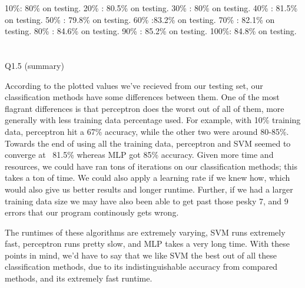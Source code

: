 \documentclass{article}
\begin{document}
10\%: 80\%  on testing.
20\% : 80.5\% on testing.
30\% : 80\% on testing.
40\% : 81.5\% on testing.
50\% : 79.8\% on testing.
60\% :83.2\% on testing.
70\% : 82.1\% on testing.
80\% : 84.6\% on testing.
90\% : 85.2\% on testing.
100\%: 84.8\% on testing.
\\
\\
\\
{\LARGE Q1.5 (summary)}

According to the plotted values we've recieved from our testing set, our classification methods have some differences between them. One of the most flagrant differences is that perceptron does the worst out of all of them, more generally with less training data percentage used. For example, with 10\% training data, perceptron hit a 67\% accuracy, while the other two were around 80-85\%. Towards the end of using all the training data, perceptron and SVM seemed to converge at ~81.5\% whereas MLP got 85\% accuracy. Given more time and resources, we could have ran tons of iterations on our classification methods; this takes a ton of time. We could also apply a learning rate if we knew how, which would also give us better results and longer runtime. Further, if we had a larger training data size we may have also been able to get past those pesky 7, and 9 errors that our program continously gets wrong.

The runtimes of these algorithms are extremely varying, SVM runs extremely fast, perceptron runs pretty slow, and MLP takes a very long time. With these points in mind, we'd have to say that we like SVM the best out of all these classification methods, due to its indistinguishable accuracy from compared methods, and its extremely fast runtime.
\end{document}
